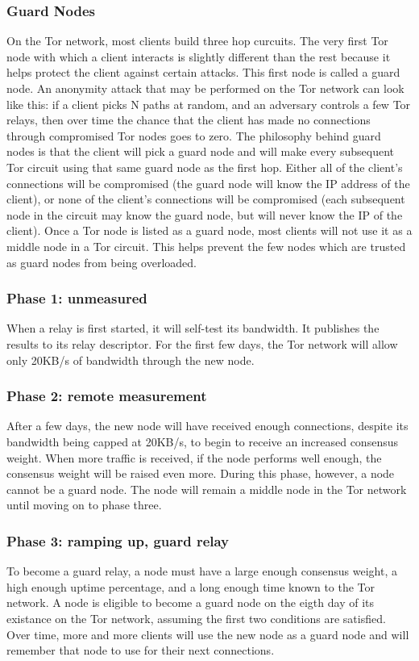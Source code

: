 \documentclass[12pt,journal]{IEEEtran}
\begin{document}
\subsubsection{Guard Nodes}
On the Tor network, most clients build three hop curcuits. The very first Tor node with which a client interacts is slightly different than the rest because it helps protect the client against certain attacks. This first node is called a guard node. An anonymity attack that may be performed on the Tor network can look like this: if a client picks N paths at random, and an adversary controls a few Tor relays, then over time the chance that the client has made no connections through compromised Tor nodes goes to zero. The philosophy behind guard nodes is that the client will pick a guard node and will make every subsequent Tor circuit using that same guard node as the first hop. Either all of the client's connections will be compromised (the guard node will know the IP address of the client), or none of the client's connections will be compromised (each subsequent node in the circuit may know the guard node, but will never know the IP of the client). Once a Tor node is listed as a guard node, most clients will not use it as a middle node in a Tor circuit. This helps prevent the few nodes which are trusted as guard nodes from being overloaded.
\subsubsection{Phase 1: unmeasured}
When a relay is first started, it will self-test its bandwidth. It publishes the results to its relay descriptor. For the first few days, the Tor network will allow only 20KB/s of bandwidth through the new node.
\subsubsection{Phase 2: remote measurement}
After a few days, the new node will have received enough connections, despite its bandwidth being capped at 20KB/s, to begin to receive an increased consensus weight. When more traffic is received, if the node performs well enough, the consensus weight will be raised even more. During this phase, however, a node cannot be a guard node. The node will remain a middle node in the Tor network until moving on to phase three.
\subsubsection{Phase 3: ramping up, guard relay}
To become a guard relay, a node must have a large enough consensus weight, a high enough uptime percentage, and a long enough time known to the Tor network. A node is eligible to become a guard node on the eigth day of its existance on the Tor network, assuming the first two conditions are satisfied. Over time, more and more clients will use the new node as a guard node and will remember that node to use for their next connections.
\end{document}
